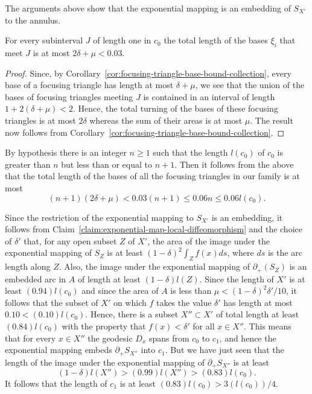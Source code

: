 The arguments above show that the exponential mapping is an
embedding of $S_{X'}$ to the annulus.




\begin{claim}
\label{claim:focusing-triangle-total-base-length-bound}
For every subinterval $J$ of length one in $c_0$ the total length of
the bases $\xi_i$ that meet $J$ is at most $2\delta+\mu<0.03$.
\end{claim}

\begin{proof}
Since, by Corollary~\ref{cor:focusing-triangle-base-bound-collection}, every base of a focusing triangle
has length at most $\delta+\mu$, we see that the union of the bases
of focusing triangles meeting $J$ is contained in an interval of
length $1+2(\delta+\mu)<2$. Hence, the total turning of the bases of
these focusing triangles is at most $2\delta$ whereas the sum of
their areas is at most $\mu$. The result now follows from
Corollary~\ref{cor:focusing-triangle-base-bound-collection}.
\end{proof}

By hypothesis there is an integer $n\ge 1$ such that the length
$l(c_0)$ of $c_0$ is greater than $n$ but less than or equal to
$n+1$. Then it follows from the above that the total length of the
bases of all the focusing triangles in our family is at most
$$(n+1)(2\delta+\mu)< 0.03(n+1)\le 0.06n\le  0.06 l(c_0).$$


Since the restriction of the exponential mapping to $S_{X'}$ is an
embedding, it follows from Claim~\ref{claim:exponential-map-local-diffeomorphism} and the choice of
$\delta'$ that, for any open subset $Z$ of $X'$, the area of the
image under the exponential mapping of $S_Z$ is at least
$(1-\delta)^2\int_Zf(x)ds$, where $ds$ is the arc length along $Z$.
Also, the image under the exponential mapping of $\partial_+(S_Z)$
is an embedded arc in $A$ of length at least $(1-\delta)l(Z)$. Since
the length of $X'$ is at least $(0.94)l(c_0)$ and since the area of
$A$ is less than $\mu<(1-\delta)^2\delta'/10$, it follows that the
subset of $X'$ on which $f$ takes the value $\delta'$ has length at
most $0.10<(0.10)l(c_0)$. Hence, there is a subset $X''\subset X'$
of total length at least $(0.84)l(c_0)$ with the property that
$f(x)<\delta'$ for all $x\in X''$. This means that for every $x\in
X''$ the geodesic $D_x$ spans from $c_0$ to $c_1$, and hence the
exponential mapping embeds $\partial_+S_{X''}$ into $c_1$. But we
have just seen that the length of the image under the exponential
mapping of $\partial_+S_{X''}$  is at least
$$(1-\delta)l(X'')>(0.99)l(X'')>(0.83)l(c_0).$$
It follows  that the length of $c_1$ is at least
$(0.83)l(c_0)>3(l(c_0))/4$.

